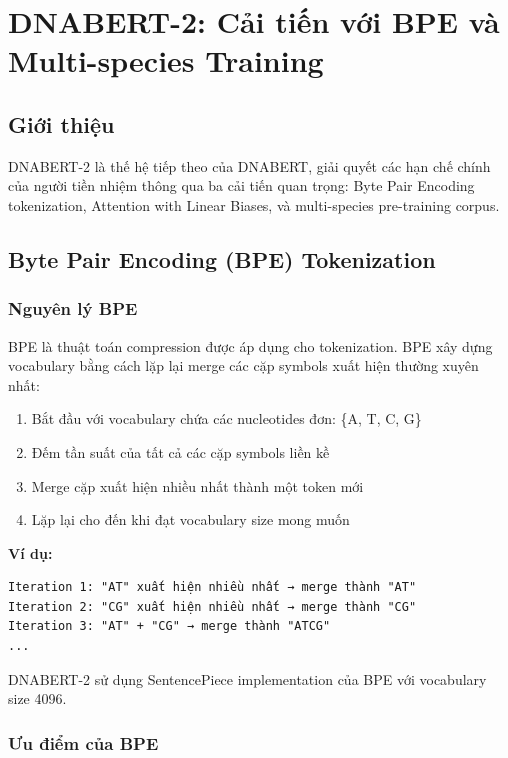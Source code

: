 \section{DNABERT-2: Cải tiến với BPE và Multi-species Training}
\label{sec:dnabert2}

\subsection{Giới thiệu}

DNABERT-2 \cite{zhou2023dnabert} là thế hệ tiếp theo của DNABERT, giải quyết các hạn chế chính của người tiền nhiệm thông qua ba cải tiến quan trọng: Byte Pair Encoding tokenization, Attention with Linear Biases, và multi-species pre-training corpus.

\subsection{Byte Pair Encoding (BPE) Tokenization}

\subsubsection{Nguyên lý BPE}

BPE \cite{sennrich2015neural} là thuật toán compression được áp dụng cho tokenization. BPE xây dựng vocabulary bằng cách lặp lại merge các cặp symbols xuất hiện thường xuyên nhất:

\begin{enumerate}
    \item Bắt đầu với vocabulary chứa các nucleotides đơn: \{A, T, C, G\}
    \item Đếm tần suất của tất cả các cặp symbols liền kề
    \item Merge cặp xuất hiện nhiều nhất thành một token mới
    \item Lặp lại cho đến khi đạt vocabulary size mong muốn
\end{enumerate}

\textbf{Ví dụ:}
\begin{verbatim}
Iteration 1: "AT" xuất hiện nhiều nhất → merge thành "AT"
Iteration 2: "CG" xuất hiện nhiều nhất → merge thành "CG"
Iteration 3: "AT" + "CG" → merge thành "ATCG"
...
\end{verbatim}

DNABERT-2 sử dụng SentencePiece \cite{kudo2018sentencepiece} implementation của BPE với vocabulary size 4096.

\subsubsection{Ưu điểm của BPE}

